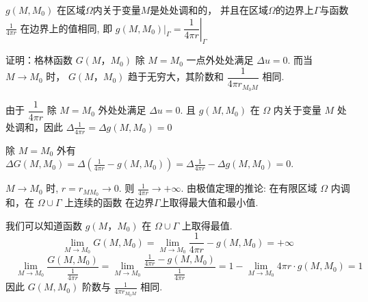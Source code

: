 \begin{questions}
{$ g\left(M, M_{0}\right) $ 在区域$\Omega$内关于变量$M$是处处调和的，
并且在区域$\Omega$的边界上$\Gamma$与函数 $ \frac{1}{4 \pi r} $ 在边界上的值相同, 
即 $ \left.g\left(M, M_{0}\right)\right|_{\Gamma}=\left.\dfrac{1}{4 \pi r}\right|_{\Gamma} $

证明：格林函数 $ G\left(M ， M_{0}\right) $ 除 $ M=M_{0} $ 一点外处处满足 $ \Delta u=0 $. 而当 $ M \rightarrow M_{0} $ 时， $ G\left(M ， M_{0}\right) $ 趋于无穷大，其阶数和 $ \dfrac{1}{4 \pi r_{M_{0} M}} $ 相同.
}
\begin{solution}
    由于 $ \dfrac{1}{4 \pi r} $ 除 $ M=M_{0} $ 外处处满足 $ \Delta u=0 $. 且 $ g\left(M, M_{0}\right) $ 在 $ \Omega $ 内关于变量 $ M $ 处处调和，因此 $ \Delta \frac{1}{4 \pi r}=\Delta g\left(M, M_{0}\right)=0 $

除 $ M=M_{0} $ 外有 $ \Delta G\left(M, M_{0}\right)=\Delta\left(\frac{1}{4 \pi r}-g\left(M, M_{0}\right)\right)=\Delta \frac{1}{4 \pi r}-\Delta g\left(M, M_{0}\right)=0 $. 

$ M \rightarrow M_{0} $ 时, $ r=r_{M M_{0}} \rightarrow 0 $. 则 $ \frac{1}{4 \pi r} \rightarrow+\infty $.
由极值定理的推论: 在有限区域 $ \Omega $ 内调和，在 $ \Omega \cup \Gamma $ 上连续的函数 在边界$\Gamma$上取得最大值和最小值.

我们可以知道函数 $ g\left(M ， M_{0}\right) $ 在 $ \Omega \cup \Gamma $ 上取得最值.
$$\lim _{M \rightarrow M_{0}} G\left(M, M_{0}\right)=\lim _{M \rightarrow M_{0}} \frac{1}{4 \pi r}-g\left(M, M_{0}\right)=+\infty $$
$$
\quad \lim _{M \rightarrow M_{0}} \frac{G\left(M, M_{0}\right)}{\frac{1}{4 \pi r}}=\lim _{M \rightarrow M_{0}} \frac{\frac{1}{4 \pi r}-g\left(M, M_{0}\right)}{\frac{1}{4 \pi r}}=1-\lim _{M \rightarrow M_{0}} 4 \pi r \cdot g\left(M, M_{0}\right)=1
$$
因此 $ G\left(M, M_{0}\right) $ 阶数与 $ \frac{1}{4 \pi r_{M_{0} M}} $ 相同.
\end{solution}

\end{questions}